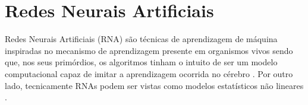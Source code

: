 \documentclass{automatextcc}
\begin{document}
\section{Redes Neurais Artificiais}

Redes Neurais Artificiais (RNA) são técnicas de aprendizagem de máquina inspiradas no mecanismo de aprendizagem presente em organismos vivos \citep{aggarwal2018} sendo que, nos seus primórdios, os algoritmos tinham o intuito de ser um modelo computacional capaz de imitar a aprendizagem ocorrida no cérebro \citep{goodfellow2016}.  Por outro lado, tecnicamente RNAs podem ser vistas como modelos estatísticos não lineares \citep{hastie2009}.
\end{document}
